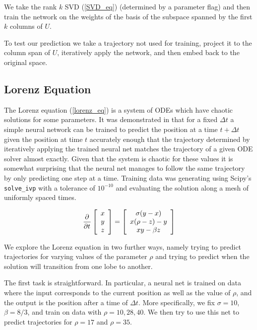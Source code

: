 \documentclass[10pt]{article}
\begin{document}
We take the rank \( k \) SVD (\ref{SVD_eq}) (determined by a parameter flag) and then train the network on the weights of the basis of the subspace spanned by the first \( k \) columns of \( U \).

To test our prediction we take a trajectory not used for training, project it to the column span of \( U \), iteratively apply the network, and then embed back to the original space.


\subsection{Lorenz Equation}
The Lorenz equation (\ref{lorenz_eq}) is a system of ODEs which have chaotic solutions for some parameters. It was demonstrated in \cite{lecture_notes} that for a fixed \( \Delta t \) a simple neural network can be trained to predict the position at a time \( t+\Delta t \) given the position at time \( t \) accurately enough that the trajectory determined by iteratively applying the trained neural net matches the trajectory of a given ODE solver almost exactly. Given that the system is chaotic for these values it is somewhat surprising that the neural net manages to follow the same trajectory by only predicting one step at a time. Training data was generating using Scipy's {\tt solve\_ivp} with a tolerance of \( 10^{-10} \) and evaluating the solution along a mesh of uniformly spaced times.

\begin{align}
    \frac{\partial^{}}{\partial t^{}} \left[\begin{array}{c}x\\y\\z\end{array}\right]
    =
    \left[\begin{array}{c}
        \sigma(y-x) \\
        x (\rho-z)-y \\
        x y-\beta z
    \end{array}\right] \label{lorenz_eq}
\end{align}

We explore the Lorenz equation in two further ways, namely trying to predict trajectories for varying values of the parameter \( \rho \) and trying to predict when the solution will transition from one lobe to another.

The first task is straightforward. In particular, a neural net is trained on data where the input corresponds to the current position as well as the value of \( \rho \), and the output is the position after a time of \( \Delta t \). More specifically, we fix \( \sigma = 10 \), \( \beta = 8/3 \), and train on data with \( \rho = 10,28,40 \). We then try to use this net to predict trajectories for \( \rho = 17 \) and \( \rho = 35 \).
\end{document}
